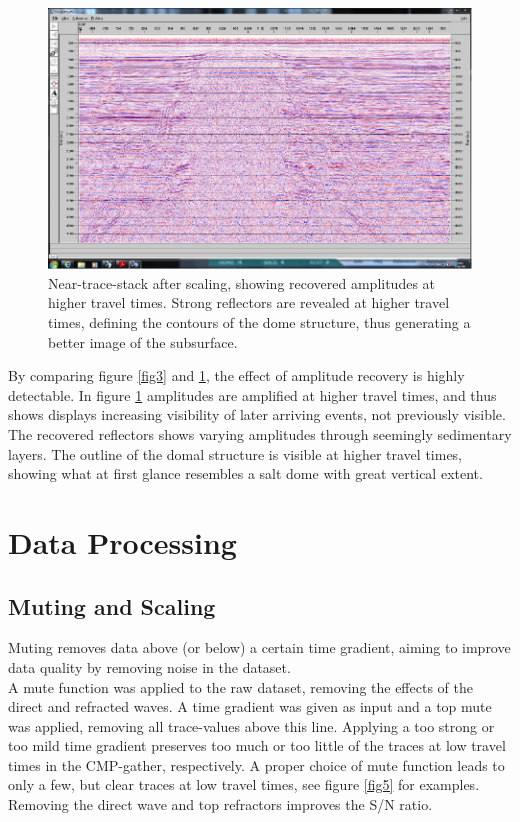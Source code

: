 \documentclass[10pt,a4paper]{article}
\begin{document}
\begin{figure}[H]
\includegraphics[width=\textwidth, trim={0.5cm 0.8cm 0.2cm 0.5cm},clip]{fig4.jpg}
\caption{Near-trace-stack after scaling, showing recovered amplitudes at higher travel times. Strong reflectors are revealed at higher travel times, defining the contours of the dome structure, thus generating a better image of the subsurface.}
\label{fig4}
\end{figure}

\noindent By comparing figure \ref{fig3} and \ref{fig4}, the effect of amplitude recovery is highly detectable. In figure \ref{fig4} amplitudes are amplified at higher travel times, and thus shows displays increasing visibility of later arriving events, not previously visible. The recovered reflectors shows varying amplitudes through seemingly sedimentary layers. The outline of the domal structure is visible at higher travel times, showing what at first glance resembles a salt dome with great vertical extent.

\section{Data Processing}

\subsection{Muting and Scaling}

Muting removes data above (or below) a certain time gradient, aiming to improve data quality by removing noise in the dataset.
\\
A mute function was applied to the raw dataset, removing the effects of the direct and refracted waves. A time gradient was given as input and a top mute was applied, removing all trace-values above this line. Applying a too strong or too mild time gradient preserves too much or too little of the traces at low travel times in the CMP-gather, respectively. A proper choice of mute function leads to only a few, but clear traces at low travel times, see figure \ref{fig5} for examples. Removing the direct wave and top refractors improves the S/N ratio.
\end{document}
